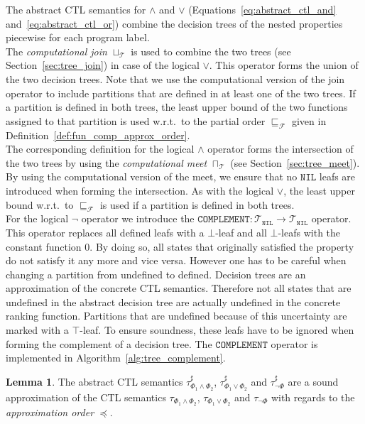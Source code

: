 \documentclass[11pt,a4paper,titlepage]{article}
\theoremstyle{definition}
\newtheorem{lemma}[theorem]{Lemma}
\begin{document}
The abstract CTL semantics for $\land$ and $\lor$ (Equations~\ref{eq:abstract_ctl_and} and~\ref{eq:abstract_ctl_or}) combine the decision trees
of the nested properties piecewise for each program label.\\

The \textit{computational join} $\sqcup_{\mathcal{T}}$ is used to combine the two trees (see Section~\ref{sec:tree_join}) in
case of the logical $\lor$. This operator forms the union of the two decision trees. 
Note that we use the computational version of the join operator to include partitions that are defined in at least one of the two trees. 
If a partition is defined in both trees, the least upper bound of the two functions assigned to that partition is used w.r.t.\ to the 
partial order $\sqsubseteq_{\mathcal{F}}$ given in Definition~\ref{def:fun_comp_approx_order}.\\

The corresponding definition for the logical $\land$ operator forms the intersection of the two trees by using the
\textit{computational meet} $\sqcap_{\mathcal{T}}$ (see Section~\ref{sec:tree_meet}). 
By using the computational version of the meet, we ensure that no $\mathtt{NIL}$ leafs are introduced when forming the intersection.
As with the logical $\lor$, the least upper bound w.r.t.\ to $\sqsubseteq_{\mathcal{F}}$ is used if a partition is defined in both trees.\\

For the logical $\neg$ operator we introduce the $\mathtt{COMPLEMENT}\colon \mathcal{T}_\mathtt{NIL} \rightarrow \mathcal{T}_\mathtt{NIL}$ operator. 
This operator replaces all defined leafs with a $\bot$-leaf and all $\bot$-leafs with the constant function $0$.
By doing so, all states that originally satisfied the property do not satisfy it any more and vice versa.
However one has to be careful when changing a partition from undefined to defined. Decision trees are an 
approximation of the concrete CTL semantics. Therefore not all states that are undefined in the abstract decision tree
are actually undefined in the concrete ranking function. Partitions that are undefined because of this uncertainty are marked with a 
$\top$-leaf. To ensure soundness, these leafs have to be ignored when forming the complement of a decision tree.   
The $\mathtt{COMPLEMENT}$ operator is implemented in Algorithm~\ref{alg:tree_complement}.


\begin{lemma}
    The abstract CTL semantics $\tau^{\sharp}_{\Phi_1 \land \Phi_2}$, $\tau^{\sharp}_{\Phi_1 \lor \Phi_2}$ and $\tau^{\sharp}_{\neg \Phi}$ 
    are a sound approximation of the CTL semantics
    $\tau_{\Phi_1 \land \Phi_2}$, $\tau_{\Phi_1 \lor \Phi_2}$ and $\tau_{\neg \Phi}$ with regards to the \textit{approximation order} $\preceq$.
\end{lemma}
\end{document}
